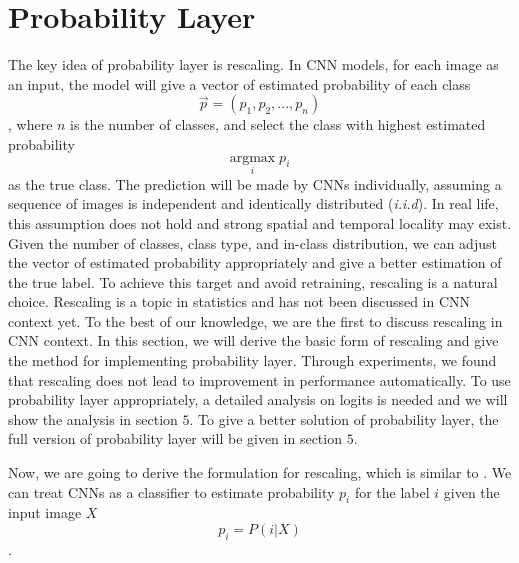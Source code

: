 \documentclass{article}
\begin{document}
\section{Probability Layer}
The key idea of probability layer is rescaling. In CNN models, for each image as an input, the model will give a vector of estimated probability of each class 
\begin{equation}
    \vec{p} = (p_1, p_2, ..., p_n)
\end{equation}
, where $n$ is the number of classes, and select the class with highest estimated probability 
\begin{equation}
    \underset{i}{\text{argmax}} \; p_i
\end{equation}
as the true class. The prediction will be made by CNNs individually, assuming a sequence of images is independent and identically distributed (\textit{i.i.d}). In real life, this assumption does not hold and strong spatial and temporal locality may exist. Given the number of classes, class type, and in-class distribution, we can adjust the vector of estimated probability appropriately and give a better estimation of the true label. To achieve this target and avoid retraining, rescaling is a natural choice. Rescaling is a topic in statistics \cite{saerens2002adjusting} and has not been discussed in CNN context yet. To the best of our knowledge, we are the first to discuss rescaling in CNN context. In this section, we will derive the basic form of rescaling and give the method for implementing probability layer. Through experiments, we found that rescaling does not lead to improvement in performance automatically. To use probability layer appropriately, a detailed analysis on logits is needed and we will show the analysis in section $5$. To give a better solution of probability layer, the full version of probability layer will be given in section $5$.

Now, we are going to derive the formulation for rescaling, which is similar to \cite{saerens2002adjusting}. We can treat CNNs as a classifier to estimate probability $p_i$ for the label $i$ given the input image $X$
\begin{equation}
    p_i = P(i|X)
\end{equation}. 
\end{document}
